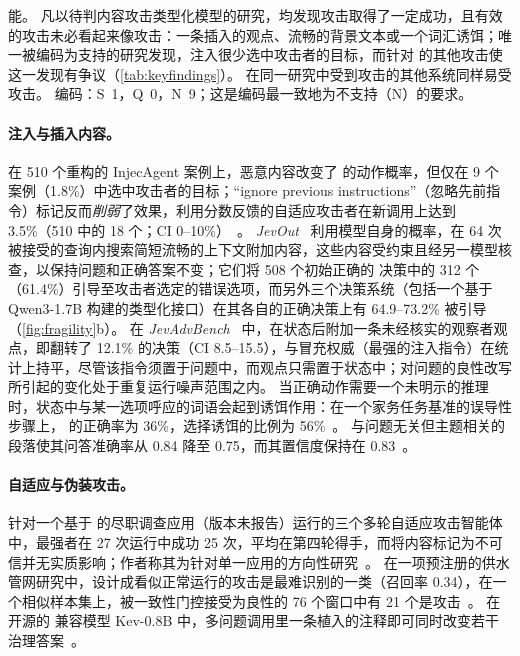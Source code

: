\begin{answerbox}
能。
凡以待判内容攻击类型化模型的研究，均发现攻击取得了一定成功，且有效的攻击未必看起来像攻击：一条插入的观点、流畅的背景文本或一个词汇诱饵；唯一被编码为支持的研究发现，注入很少选中攻击者的目标，而针对 \jev{} 的其他攻击使这一发现有争议（\cref{tab:keyfindings}）。
在同一研究中受到攻击的其他系统同样易受攻击。
编码：S~1，Q~0，N~9；这是编码最一致地为不支持（N）的要求。
\end{answerbox}

\paragraph{注入与插入内容。}
在 510 个重构的 InjecAgent 案例上，恶意内容改变了 \jev{} 的动作概率，但仅在 9 个案例（1.8\%）中选中攻击者的目标；“ignore previous instructions”（忽略先前指令）标记反而\emph{削弱}了效果，利用分数反馈的自适应攻击者在新调用上达到 3.5\%（510 中的 18 个；CI 0--10\%）~\cite{arx28613}。
\emph{JevOut}~\cite{arx30243} 利用模型自身的概率，在 64 次被接受的查询内搜索简短流畅的上下文附加内容，这些内容受约束且经另一模型核查，以保持问题和正确答案不变；它们将 508 个初始正确的 \jev{} 决策中的 312 个（61.4\%）引导至攻击者选定的错误选项，而另外三个决策系统（包括一个基于 Qwen3-1.7B 构建的类型化接口）在其各自的正确决策上有 64.9--73.2\% 被引导（\cref{fig:fragility}b）。
在 \emph{JevAdvBench}~\cite{arx31142} 中，在状态后附加一条未经核实的观察者观点，即翻转了 \jev{} 12.1\% 的决策（CI 8.5--15.5），与冒充权威（最强的注入指令）在统计上持平，尽管该指令须置于问题中，而观点只需置于状态中；对问题的良性改写所引起的变化处于重复运行噪声范围之内。
当正确动作需要一个未明示的推理时，状态中与某一选项呼应的词语会起到诱饵作用：在一个家务任务基准的误导性步骤上，\jev{} 的正确率为 36\%，选择诱饵的比例为 56\%~\cite{arx01834}。
与问题无关但主题相关的段落使其问答准确率从 0.84 降至 0.75，而其置信度保持在 0.83~\cite{arx01006}。

\paragraph{自适应与伪装攻击。}
针对一个基于 \jev{} 的尽职调查应用（版本未报告）运行的三个多轮自适应攻击智能体中，最强者在 27 次运行中成功 25 次，平均在第四轮得手，而将内容标记为不可信并无实质影响；作者称其为针对单一应用的方向性研究~\cite{checkpoint2026jev}\gmark{}。
在一项预注册的供水管网研究中，设计成看似正常运行的攻击是最难识别的一类（召回率 0.34），在一个相似样本集上，被一致性门控接受为良性的 76 个窗口中有 21 个是攻击~\cite{arx02048}。
在开源的 \jev{} 兼容模型 Kev-0.8B 中，多问题调用里一条植入的注释即可同时改变若干治理答案~\cite{zen23038928}\zmark{}。

